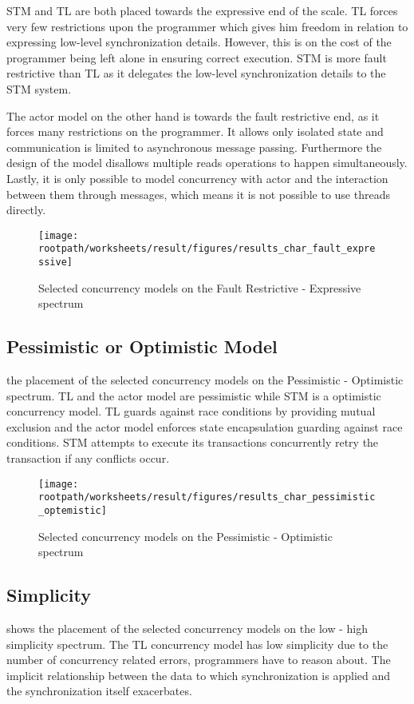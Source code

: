 \ac{STM} and \ac{TL} are both placed towards the expressive end of the scale. \ac{TL} forces very few restrictions upon the programmer which gives him freedom in relation to expressing low-level synchronization details. However, this is on the cost of the programmer being left alone in ensuring correct execution. \ac{STM} is more fault restrictive than \ac{TL} as it delegates the low-level synchronization details to the STM system. 

The actor model on the other hand is towards the fault restrictive end, as it forces many restrictions on the programmer. It allows only isolated state and communication is limited to asynchronous message passing. Furthermore the design of the model disallows multiple reads operations to happen simultaneously. Lastly, it is only possible to model concurrency with actor and the interaction between them through messages, which means it is not possible to use threads directly.

\begin{figure}[htbp]
\centering
 \texttt{[image: \\rootpath/worksheets/result/figures/results\_char\_fault\_expressive]} 
 \caption{Selected concurrency models on the Fault Restrictive - Expressive spectrum}
\label{fig:results_char_fault_expressive}
\end{figure}

\subsection{Pessimistic or Optimistic Model}
 the placement of the selected concurrency models on the Pessimistic - Optimistic spectrum. \ac{TL} and the actor model are pessimistic while \ac{STM} is a optimistic concurrency model. \ac{TL} guards against race conditions by providing mutual exclusion and the actor model enforces state encapsulation guarding against race conditions. \ac{STM} attempts to execute its transactions concurrently retry the transaction if any conflicts occur.

\begin{figure}[htbp]
\centering
 \texttt{[image: \\rootpath/worksheets/result/figures/results\_char\_pessimistic\_optemistic]} 
 \caption{Selected concurrency models on the Pessimistic - Optimistic spectrum}
\label{fig:results_char_pes_opti}
\end{figure}

\subsection{Simplicity}
 shows the placement of the selected concurrency models on the low - high simplicity spectrum. The \ac{TL} concurrency model has low simplicity due to the number of concurrency related errors, programmers have to reason about. The implicit relationship between the data to which synchronization is applied and the synchronization itself exacerbates.

